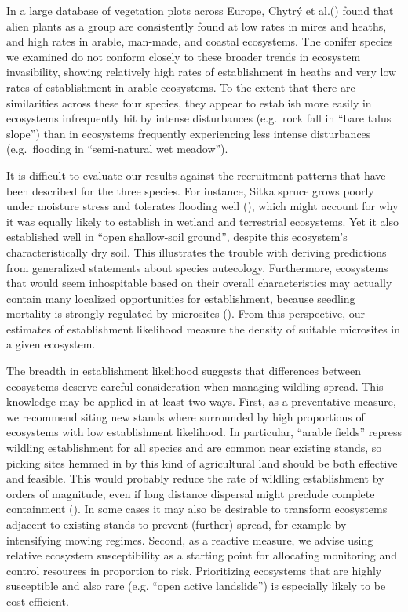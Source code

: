 \documentclass[
]{article}
\begin{document}
In a large database of vegetation plots across Europe, Chytrý et
al.() found that alien plants as a group are
consistently found at low rates in mires and heaths, and high rates in arable,
man-made, and coastal ecosystems. The conifer species we examined do not conform
closely to these broader trends in ecosystem invasibility, showing relatively
high rates of establishment in heaths and very low rates of establishment in
arable ecosystems. To the extent that there are similarities across these four
species, they appear to establish more easily in ecosystems infrequently hit by
intense disturbances (e.g.~rock fall in ``bare talus slope'') than in ecosystems
frequently experiencing less intense disturbances (e.g.~flooding in
``semi-natural wet meadow'').

It is difficult to evaluate our results against the recruitment patterns that
have been described for the three species. For instance, Sitka spruce grows
poorly under moisture stress and tolerates flooding well
(), which might account for why it was
equally likely to establish in wetland and terrestrial ecosystems. Yet it also
established well in ``open shallow-soil ground'', despite this ecosystem's
characteristically dry soil. This illustrates the trouble with deriving
predictions from generalized statements about species autecology. Furthermore,
ecosystems that would seem inhospitable based on their overall characteristics
may actually contain many localized opportunities for establishment, because
seedling mortality is strongly regulated by microsites
(). From this perspective, our estimates of
establishment likelihood measure the density of suitable microsites in a given
ecosystem.

The breadth in establishment likelihood suggests that differences between
ecosystems deserve careful consideration when managing wildling spread. This
knowledge may be applied in at least two ways. First, as a preventative measure,
we recommend siting new stands where surrounded by high proportions of
ecosystems with low establishment likelihood. In particular, ``arable fields''
repress wildling establishment for all species and are common near existing
stands, so picking sites hemmed in by this kind of agricultural land should be
both effective and feasible. This would probably reduce the rate of wildling
establishment by orders of magnitude, even if long distance dispersal might
preclude complete containment (). In some cases
it may also be desirable to transform ecosystems adjacent to existing stands to
prevent (further) spread, for example by intensifying mowing regimes. Second, as
a reactive measure, we advise using relative ecosystem susceptibility as a
starting point for allocating monitoring and control resources in proportion to
risk. Prioritizing ecosystems that are highly susceptible and also rare (e.g.
``open active landslide'') is especially likely to be cost-efficient.
\end{document}
